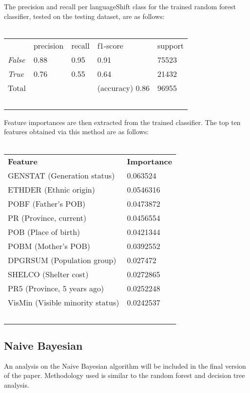 \documentclass[10pt, conference, compsocconf]{IEEEtran}
\begin{document}
The precision and recall per languageShift class for the trained random forest classifier, tested on the testing dataset, are as follows:\\\

\begin{tabular}{lllll}
                              & precision & recall & f1-score        & support \\
\textit{False} & 0.88      & 0.95   & 0.91            & 75523   \\
\textit{True}         & 0.76      & 0.55   & 0.64            & 21432   \\
Total                       &           &        & (accuracy) 0.86 & 96955   \\\
\end{tabular}

Feature importances are then extracted from the trained classifier.  The top ten features obtained via this method are as follows:\\\

\begin{tabular}{ll}
\textbf{Feature} & \textbf{Importance} \\
GENSTAT (Generation status)         & 0.063524 \\
ETHDER (Ethnic origin)          & 0.0546316           \\
POBF (Father's POB)            & 0.0473872           \\
PR (Province, current)              & 0.0456554           \\
POB (Place of birth)             & 0.0421344           \\
POBM (Mother's POB)            & 0.0392552           \\
DPGRSUM (Population group)         & 0.027472            \\
SHELCO (Shelter cost)          & 0.0272865           \\
PR5 (Province, 5 years ago)             & 0.0252248           \\
VisMin (Visible minority status)           & 0.0242537            \\\
\end{tabular}

\subsection{Naive Bayesian}

An analysis on the Naive Bayesian algorithm will be included in the final version of the paper. Methodology used is similar to the random forest and decision tree analysis.
\end{document}
